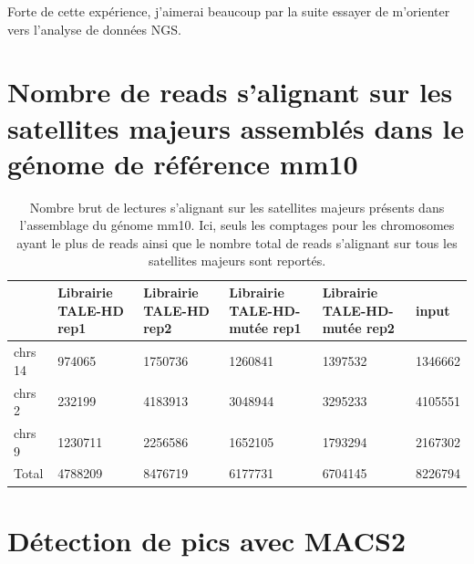 \documentclass[a4paper,12pt,times]{report}
\newcommand{\scaption}[1]{\caption{\footnotesize{#1}}}
\begin{document}
\bigskip
Forte de cette expérience, j’aimerai beaucoup par la suite essayer de m’orienter vers l'analyse de données NGS. 
 
  

\begin{appendices}

\newpage
\section{Nombre de reads s'alignant sur les satellites majeurs assemblés dans le génome de référence mm10}

\begin{table}[!htb]
\centering
 \begin{tabular}{|p{1.5cm}|p{2cm}|p{2cm}|p{1.5cm}|p{2cm}|p{2cm}|}

\hline
  & Librairie TALE-HD rep1 & Librairie TALE-HD rep2 & Librairie TALE-HD-mutée rep1&  Librairie TALE-HD-mutée rep2 &  input \\
\hline
chrs 14 & 974065 & 1750736 &  1260841 & 1397532 & 1346662    \\
\hline
chrs 2 & 232199 &  4183913 & 3048944& 3295233 & 4105551   \\
\hline
chrs 9 & 1230711 & 2256586 & 1652105 & 1793294 & 2167302  \\
\hline
Total & 4788209& 8476719 & 6177731 & 6704145 & 8226794 \\
\hline
\end{tabular}
\scaption{Nombre brut de lectures s'alignant sur les satellites majeurs présents dans l'assemblage du génome mm10. Ici,  seuls les comptages pour les chromosomes ayant le plus de reads ainsi que le nombre total de reads s'alignant sur tous les satellites majeurs sont reportés. }
\label{tab3}
\end{table}


\newpage
\section{Détection de pics avec MACS2}

\end{appendices}
\end{document}
